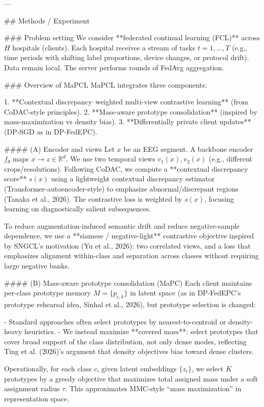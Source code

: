 ---

## Methods / Experiment  

### Problem setting  
We consider **federated continual learning (FCL)** across \(H\) hospitals (clients). Each hospital receives a stream of tasks \(t=1,\dots,T\) (e.g., time periods with shifting label proportions, device changes, or protocol drift). Data remain local. The server performs rounds of FedAvg aggregation.

### Overview of MaPCL  
MaPCL integrates three components:

1. **Contextual discrepancy–weighted multi-view contrastive learning** (from CoDAC-style principles).  
2. **Mass-aware prototype consolidation** (inspired by mass-maximization vs density bias).  
3. **Differentially private client updates** (DP-SGD as in DP-FedEPC).

#### (A) Encoder and views  
Let \(x\) be an EEG segment. A backbone encoder \(f_\theta\) maps \(x\to z\in\mathbb{R}^d\). We use two temporal views \(v_1(x), v_2(x)\) (e.g., different crops/resolutions). Following CoDAC, we compute a **contextual discrepancy score** \(s(x)\) using a lightweight contextual discrepancy estimator (Transformer-autoencoder-style) to emphasize abnormal/discrepant regions (Tanaka et al., 2026). The contrastive loss is weighted by \(s(x)\), focusing learning on diagnostically salient subsequences.

To reduce augmentation-induced semantic drift and reduce negative-sample dependence, we use a **siamese / negative-light** contrastive objective inspired by SNGCL’s motivation (Yu et al., 2026): two correlated views, and a loss that emphasizes alignment within-class and separation across classes without requiring large negative banks.

#### (B) Mass-aware prototype consolidation (MaPC)  
Each client maintains per-class prototype memory \(M=\{p_{c,k}\}\) in latent space (as in DP-FedEPC’s prototype rehearsal idea, Sinhal et al., 2026), but prototype selection is changed:

- Standard approaches often select prototypes by nearest-to-centroid or density-heavy heuristics.  
- We instead maximize **covered mass**: select prototypes that cover broad support of the class distribution, not only dense modes, reflecting Ting et al. (2026)’s argument that density objectives bias toward dense clusters.

Operationally, for each class \(c\), given latent embeddings \(\{z_i\}\), we select \(K\) prototypes by a greedy objective that maximizes total assigned mass under a soft assignment radius \(\tau\). This approximates MMC-style “mass maximization” in representation space.

